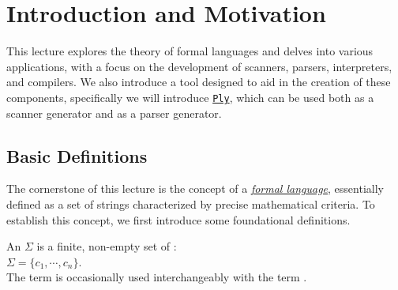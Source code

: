 \chapter{Introduction and Motivation}
This lecture explores the theory of formal languages and delves into various applications, with a focus on the
development of scanners, parsers, interpreters, and compilers. We also introduce a tool designed to aid in the
creation of these components, specifically we will introduce
\href{https://www.dabeaz.com/ply/ply.html}{\texttt{Ply}}, which can be used both as a scanner generator and as
a parser generator. 

\section{Basic Definitions}
The cornerstone of this lecture is the concept of a \href{http://en.wikipedia.org/wiki/Formal_language}{\emph{formal language}},  essentially defined as a set of strings characterized by precise mathematical criteria. To establish this concept, we first introduce some foundational definitions.

\begin{Definition}[Alphabet]
An  \( \Sigma \)  is a finite, non-empty set of :
\\[0.2cm]
\hspace*{1.3cm}
\( \Sigma = \{ c_1, \cdots, c_n \} \).
\\[0.2cm]
The term   is occasionally used interchangeably with the term .
\eox
\end{Definition}


